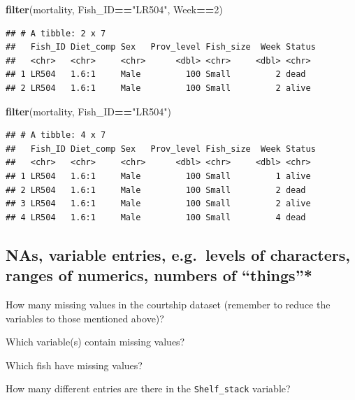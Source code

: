 \documentclass[]{book}
\newenvironment{Shaded}{\begin{snugshade}}{\end{snugshade}}
\newcommand{\DecValTok}[1]{\textcolor[rgb]{0.00,0.00,0.81}{#1}}
\newcommand{\KeywordTok}[1]{\textcolor[rgb]{0.13,0.29,0.53}{\textbf{#1}}}
\newcommand{\NormalTok}[1]{#1}
\newcommand{\OperatorTok}[1]{\textcolor[rgb]{0.81,0.36,0.00}{\textbf{#1}}}
\newcommand{\StringTok}[1]{\textcolor[rgb]{0.31,0.60,0.02}{#1}}
\begin{document}
\begin{Shaded}
\begin{Highlighting}[]
\KeywordTok{filter}\NormalTok{(mortality, Fish_ID}\OperatorTok{==}\StringTok{"LR504"}\NormalTok{, Week}\OperatorTok{==}\DecValTok{2}\NormalTok{)}
\end{Highlighting}
\end{Shaded}

\begin{verbatim}
## # A tibble: 2 x 7
##   Fish_ID Diet_comp Sex   Prov_level Fish_size  Week Status
##   <chr>   <chr>     <chr>      <dbl> <chr>     <dbl> <chr> 
## 1 LR504   1.6:1     Male         100 Small         2 dead  
## 2 LR504   1.6:1     Male         100 Small         2 alive
\end{verbatim}

\begin{Shaded}
\begin{Highlighting}[]
\KeywordTok{filter}\NormalTok{(mortality, Fish_ID}\OperatorTok{==}\StringTok{"LR504"}\NormalTok{)}
\end{Highlighting}
\end{Shaded}

\begin{verbatim}
## # A tibble: 4 x 7
##   Fish_ID Diet_comp Sex   Prov_level Fish_size  Week Status
##   <chr>   <chr>     <chr>      <dbl> <chr>     <dbl> <chr> 
## 1 LR504   1.6:1     Male         100 Small         1 alive 
## 2 LR504   1.6:1     Male         100 Small         2 dead  
## 3 LR504   1.6:1     Male         100 Small         2 alive 
## 4 LR504   1.6:1     Male         100 Small         4 dead
\end{verbatim}

\hypertarget{nas-variable-entries-e.g.levels-of-characters-ranges-of-numerics-numbers-of-things}{%
\subsection{NAs, variable entries, e.g.~levels of characters, ranges of numerics, numbers of ``things''*}\label{nas-variable-entries-e.g.levels-of-characters-ranges-of-numerics-numbers-of-things}}

How many missing values in the courtship dataset (remember to reduce the variables to those mentioned above)?

Which variable(s) contain missing values?

Which fish have missing values?

How many different entries are there in the \texttt{Shelf\_stack} variable?
\end{document}
